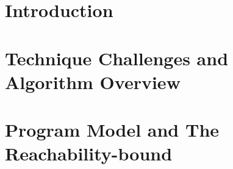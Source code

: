 \documentclass[runningheads]{llncs}
\begin{document}
\section{Introduction}
\label{sec:intro}



\section{Technique Challenges and Algorithm Overview}
\label{sec:overview}


\section{Program Model and The Reachability-bound}
\label{sec:preliminary}
% 



% 
% 
\end{document}
